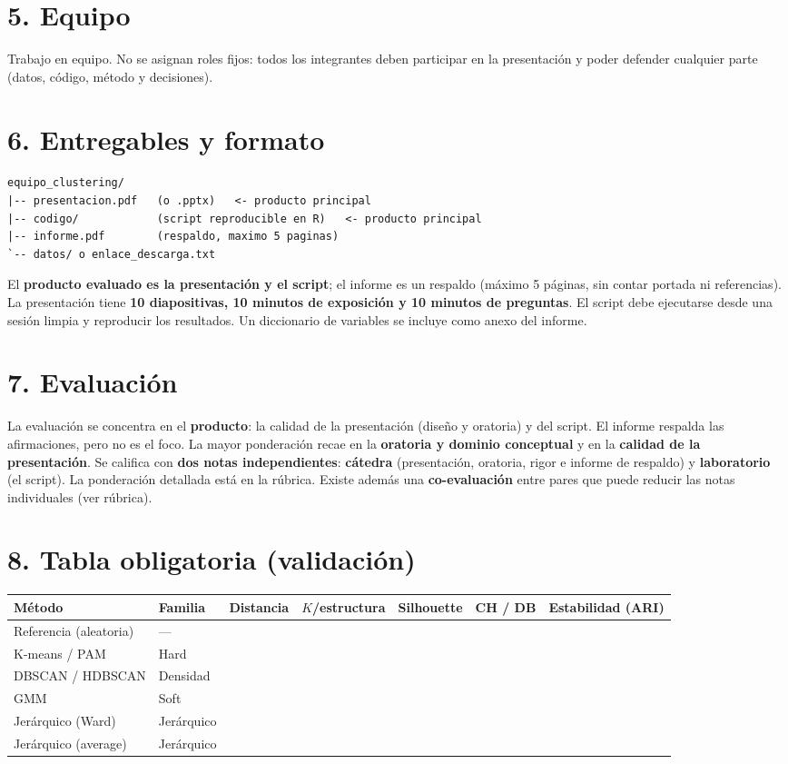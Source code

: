 \documentclass[11pt,letterpaper]{article}
\begin{document}
\section*{5. Equipo}
Trabajo en equipo. No se asignan roles fijos: todos los integrantes deben participar en la presentación y poder defender cualquier parte (datos, código, método y decisiones).

\section*{6. Entregables y formato}
\begin{verbatim}
equipo_clustering/
|-- presentacion.pdf   (o .pptx)   <- producto principal
|-- codigo/            (script reproducible en R)   <- producto principal
|-- informe.pdf        (respaldo, maximo 5 paginas)
`-- datos/ o enlace_descarga.txt
\end{verbatim}
El \textbf{producto evaluado es la presentación y el script}; el informe es un respaldo (máximo 5 páginas, sin
contar portada ni referencias). La presentación tiene \textbf{10 diapositivas, 10 minutos de exposición y 10
minutos de preguntas}. El script debe ejecutarse desde una sesión limpia y reproducir los resultados. Un
diccionario de variables se incluye como anexo del informe.

\section*{7. Evaluación}
La evaluación se concentra en el \textbf{producto}: la calidad de la presentación (diseño y oratoria) y del
script. El informe respalda las afirmaciones, pero no es el foco. La mayor ponderación recae en la
\textbf{oratoria y dominio conceptual} y en la \textbf{calidad de la presentación}. Se califica con \textbf{dos notas independientes}: \textbf{cátedra} (presentación, oratoria, rigor e informe de respaldo) y \textbf{laboratorio} (el script). La ponderación detallada está en la rúbrica. Existe además una \textbf{co-evaluación} entre pares que puede reducir las notas individuales (ver rúbrica).

\section*{8. Tabla obligatoria (validación)}
\begin{center}\small
\begin{tabular}{lllllll}
\toprule
Método & Familia & Distancia & $K$/estructura & Silhouette & CH / DB & Estabilidad (ARI) \\
\midrule
Referencia (aleatoria) & --- & & & & & \\
K-means / PAM & Hard & & & & & \\
DBSCAN / HDBSCAN & Densidad & & & & & \\
GMM & Soft & & & & & \\
Jerárquico (Ward) & Jerárquico & & & & & \\
Jerárquico (average) & Jerárquico & & & & & \\
\bottomrule
\end{tabular}\end{center}
\end{document}
